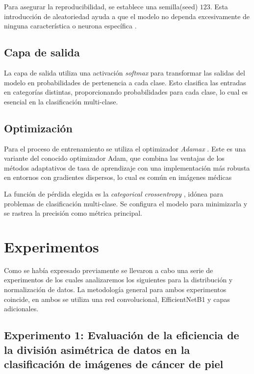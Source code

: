    Para asegurar la reproducibilidad, se establece una semilla(seed) $123$. Esta introducción de aleatoriedad ayuda a que el modelo no dependa excesivamente de ninguna característica o neurona específica .
   
   \subsection{Capa de salida}
   
   La capa de salida utiliza una activación \textit{softmax} para transformar las salidas del modelo en probabilidades de pertenencia a cada clase. Esto clasifica las entradas en categorías distintas, proporcionando probabilidades para cada clase, lo cual es esencial en la clasificación multi-clase.
   
   \subsection{Optimización}
   
   Para el proceso de entrenamiento se utiliza el optimizador \textit{Adamax} . Este es una variante del conocido optimizador Adam, que combina las ventajas de los métodos adaptativos de tasa de aprendizaje con una implementación más robusta en entornos con gradientes dispersos, lo cual es común en imágenes médicas 
   
   La función de pérdida elegida es la \textit{categorical crossentropy} , idónea para problemas de clasificación multi-clase. Se configura el modelo para minimizarla y se rastrea la precisión como métrica principal.

\section{Experimentos}

Como se había expresado previamente se llevaron a cabo una serie de experimentos de los cuales analizaremos los siguientes para la distribución y normalización de datos. La metodología general para ambos experimentos coincide, en ambos se utiliza una red convolucional, EfficientNetB1 y capas adicionales.

\subsection{Experimento 1: Evaluación de la eficiencia de la división asimétrica de datos en la clasificación de imágenes de cáncer de piel}

